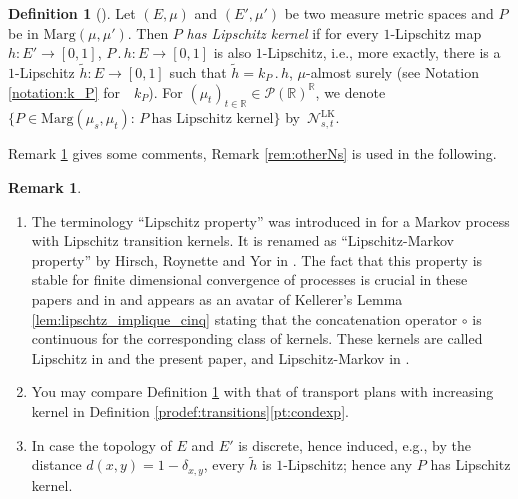 \documentclass[11pt]{article}
\newcommand{\ie}{i.e.,\xspace}
\newcommand{\skpt}{\smallskip}
\newcommand{\ldot}{\mathbin{.}}
\theoremstyle{plain}
\theoremstyle{definition}
\newtheorem{defi}[them]{Definition}
\newtheorem{rem}[them]{Remark}
\newcommand{\ML}{\mathrm{LK}}
\newcommand{\p}{\mathcal{P}}
\newcommand{\ma}{\mathrm{Marg}}
\newcommand{\R}{\mathbb{R}}
\begin{document}
\begin{defi}[{\cite[Def.\,3]{Ke72}}]\label{defi:lipschitz} Let $(E,\mu)$ and $(E',\mu')$ be two measure metric spaces and $P$ be in $\ma(\mu,\mu')$. Then $P$ \emph{has Lipschitz kernel} if for every $1$-Lipschitz map $h:E'\to [0,1]$, $P\ldot h:E\to [0,1]$ is also $1$-Lipschitz, \ie more exactly, there is a $1$-Lipschitz $\tilde h:E\to [0,1]$ such that $\tilde h=k_P\ldot h$, $\mu$-almost surely (see Notation \ref{notation:k_P} for~ $k_P$). For $(\mu_t)_{t\in\R}\in\p(\R)^\R$, we denote $\{P\in\ma(\mu_s,\mu_t):\,P\ \text{has Lipschitz kernel}\}$ by~$\mathcal{N}^\ML_{s,t}$.
\end{defi}

Remark \ref{rem:comments_ml} gives some comments, Remark \ref{rem:otherNs} is used in the following.

\skpt
\begin{rem}\label{rem:comments_ml}
\begin{enumerate}
\item
The terminology ``Lipschitz property'' was introduced in \cite[Def.\,4.1]{Low} for a Markov process with Lipschitz transition kernels. It is renamed as ``Lipschitz-Markov property'' by Hirsch, Roynette and Yor in \cite{HiRoYo14}. The fact that this property is stable for finite dimensional convergence of processes is crucial in these papers and in \cite{Low2} and appears as an avatar of Kellerer's Lemma \ref{lem:lipschtz_implique_cinq} stating that the concatenation operator $\circ$ is continuous for the corresponding class of kernels. These kernels are called Lipschitz in \cite{Ju_seminaire,BeJu16} and the present paper, and Lipschitz-Markov in \cite{BHS}.

\item
You may compare Definition \ref{defi:lipschitz} with that of transport plans with increasing kernel in Definition \ref{prodef:transitions}\eqref{pt:condexp}.

\item
\cite[p.\,115]{Ke72} In case the topology of $E$ and $E'$ is discrete, hence induced, e.g., by the distance $d(x,y)=1-\delta_{x,y}$, every $\tilde h$ is $1$-Lipschitz; hence any $P$ has Lipschitz kernel.
\end{enumerate}
\end{rem}
\end{document}
